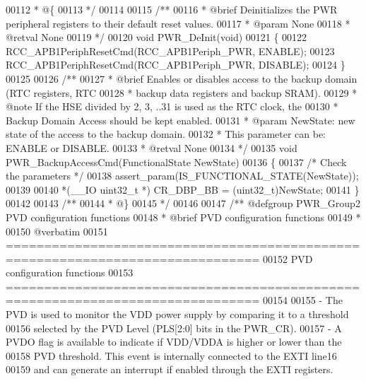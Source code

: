 \begin{DoxyCode}
00112 \textcolor{comment}{  * @\{}
00113 \textcolor{comment}{  */}
00114 
00115 \textcolor{comment}{/**}
00116 \textcolor{comment}{  * @brief  Deinitializes the PWR peripheral registers to their default reset values.     }
00117 \textcolor{comment}{  * @param  None}
00118 \textcolor{comment}{  * @retval None}
00119 \textcolor{comment}{  */}
00120 \textcolor{keywordtype}{void} PWR_DeInit(\textcolor{keywordtype}{void})
00121 \{
00122   RCC_APB1PeriphResetCmd(RCC_APB1Periph_PWR, ENABLE);
00123   RCC_APB1PeriphResetCmd(RCC_APB1Periph_PWR, DISABLE);
00124 \}
00125 
00126 \textcolor{comment}{/**}
00127 \textcolor{comment}{  * @brief  Enables or disables access to the backup domain (RTC registers, RTC }
00128 \textcolor{comment}{  *         backup data registers and backup SRAM).}
00129 \textcolor{comment}{  * @note   If the HSE divided by 2, 3, ..31 is used as the RTC clock, the }
00130 \textcolor{comment}{  *         Backup Domain Access should be kept enabled.}
00131 \textcolor{comment}{  * @param  NewState: new state of the access to the backup domain.}
00132 \textcolor{comment}{  *          This parameter can be: ENABLE or DISABLE.}
00133 \textcolor{comment}{  * @retval None}
00134 \textcolor{comment}{  */}
00135 \textcolor{keywordtype}{void} PWR_BackupAccessCmd(FunctionalState NewState)
00136 \{
00137   \textcolor{comment}{/* Check the parameters */}
00138   assert_param(IS\_FUNCTIONAL\_STATE(NewState));
00139 
00140   *(\_\_IO uint32\_t *) CR_DBP_BB = (uint32\_t)NewState;
00141 \}
00142 
00143 \textcolor{comment}{/**}
00144 \textcolor{comment}{  * @\}}
00145 \textcolor{comment}{  */}
00146 
00147 \textcolor{comment}{/** @defgroup PWR\_Group2 PVD configuration functions}
00148 \textcolor{comment}{ *  @brief   PVD configuration functions }
00149 \textcolor{comment}{ *}
00150 \textcolor{comment}{@verbatim   }
00151 \textcolor{comment}{ ===============================================================================}
00152 \textcolor{comment}{                           PVD configuration functions}
00153 \textcolor{comment}{ ===============================================================================  }
00154 \textcolor{comment}{}
00155 \textcolor{comment}{ - The PVD is used to monitor the VDD power supply by comparing it to a threshold}
00156 \textcolor{comment}{   selected by the PVD Level (PLS[2:0] bits in the PWR\_CR).}
00157 \textcolor{comment}{ - A PVDO flag is available to indicate if VDD/VDDA is higher or lower than the }
00158 \textcolor{comment}{   PVD threshold. This event is internally connected to the EXTI line16}
00159 \textcolor{comment}{   and can generate an interrupt if enabled through the EXTI registers.}

\end{DoxyCode}
